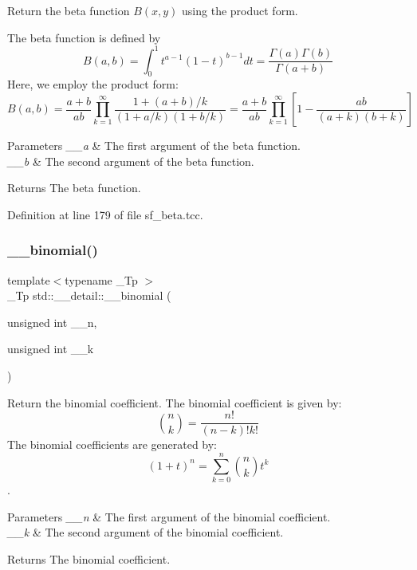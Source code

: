 Return the beta function $B(x,y)$ using the product form. 

The beta function is defined by \[ B(a,b) = \int_0^1 t^{a - 1} (1 - t)^{b - 1} dt = \frac{\Gamma(a)\Gamma(b)}{\Gamma(a+b)} \] Here, we employ the product form\+: \[ B(a,b) = \frac{a + b}{a b} \prod_{k=1}^{\infty} \frac{1 + (a + b) / k}{(1 + a / k) (1 + b / k)} = \frac{a + b}{ab} \prod_{k=1}^{\infty} \left[1 - \frac{ab}{(a + k)(b + k)}\right] \]


\begin{DoxyParams}{Parameters}
{\em \+\_\+\+\_\+a} & The first argument of the beta function. \\
\hline
{\em \+\_\+\+\_\+b} & The second argument of the beta function. \\
\hline
\end{DoxyParams}
\begin{DoxyReturn}{Returns}
The beta function. 
\end{DoxyReturn}


Definition at line 179 of file sf\+\_\+beta.\+tcc.

\mbox{\label{namespacestd_1_1____detail_a4483574682ad034be17c75ef29892b02}} 
\subsubsection{\texorpdfstring{\+\_\+\+\_\+binomial()}{\_\_binomial()}\hspace{0.1cm}{\footnotesize\ttfamily [1/2]}}
{\footnotesize\ttfamily template$<$typename \+\_\+\+Tp $>$ \\
\+\_\+\+Tp std\+::\+\_\+\+\_\+detail\+::\+\_\+\+\_\+binomial (\begin{DoxyParamCaption}\item[{unsigned int}]{\+\_\+\+\_\+n,  }\item[{unsigned int}]{\+\_\+\+\_\+k }\end{DoxyParamCaption})}



Return the binomial coefficient. The binomial coefficient is given by\+: \[ \binom{n}{k} = \frac{n!}{(n-k)! k!} \] The binomial coefficients are generated by\+: \[ \left(1 + t\right)^n = \sum_{k=0}^n \binom{n}{k} t^k \]. 


\begin{DoxyParams}{Parameters}
{\em \+\_\+\+\_\+n} & The first argument of the binomial coefficient. \\
\hline
{\em \+\_\+\+\_\+k} & The second argument of the binomial coefficient. \\
\hline
\end{DoxyParams}
\begin{DoxyReturn}{Returns}
The binomial coefficient. 
\end{DoxyReturn}


